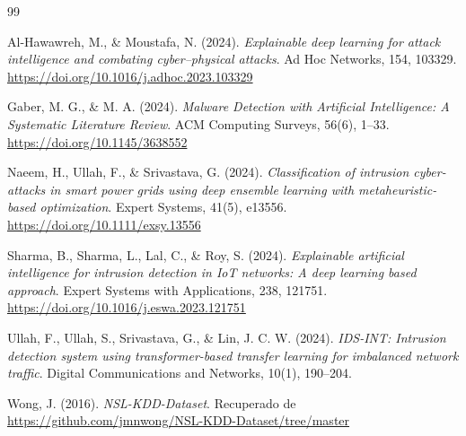 \documentclass[12pt,a4paper]{article}
\begin{document}
\begin{thebibliography}{99}

Al-Hawawreh, M., \& Moustafa, N. (2024). 
\textit{Explainable deep learning for attack intelligence and combating cyber--physical attacks}. 
Ad Hoc Networks, 154, 103329. 
\url{https://doi.org/10.1016/j.adhoc.2023.103329}

Gaber, M. G., \& M. A. (2024). 
\textit{Malware Detection with Artificial Intelligence: A Systematic Literature Review}. 
ACM Computing Surveys, 56(6), 1--33. 
\url{https://doi.org/10.1145/3638552}

Naeem, H., Ullah, F., \& Srivastava, G. (2024). 
\textit{Classification of intrusion cyber-attacks in smart power grids using deep ensemble learning with metaheuristic-based optimization}. 
Expert Systems, 41(5), e13556. 
\url{https://doi.org/10.1111/exsy.13556}

Sharma, B., Sharma, L., Lal, C., \& Roy, S. (2024). 
\textit{Explainable artificial intelligence for intrusion detection in IoT networks: A deep learning based approach}. 
Expert Systems with Applications, 238, 121751. 
\url{https://doi.org/10.1016/j.eswa.2023.121751}

Ullah, F., Ullah, S., Srivastava, G., \& Lin, J. C. W. (2024). 
\textit{IDS-INT: Intrusion detection system using transformer-based transfer learning for imbalanced network traffic}. 
Digital Communications and Networks, 10(1), 190--204.

Wong, J. (2016). 
\textit{NSL-KDD-Dataset}. 
Recuperado de \url{https://github.com/jmnwong/NSL-KDD-Dataset/tree/master}

\end{thebibliography}
\end{document}

